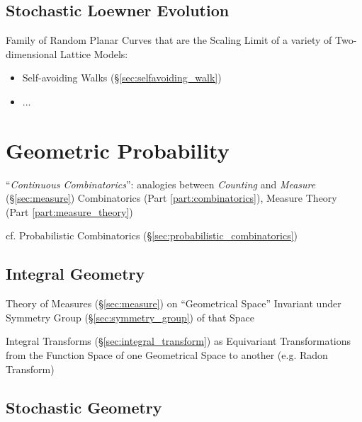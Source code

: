 \subsection{Stochastic Loewner Evolution}\label{sec:stochastic_loewner}

Family of Random Planar Curves that are the Scaling Limit of a variety of
Two-dimensional Lattice Models:
\begin{itemize}
  \item Self-avoiding Walks (\S\ref{sec:selfavoiding_walk})
  \item ...
\end{itemize}



\section{Geometric Probability}\label{sec:geometric_probability}

``\emph{Continuous Combinatorics}'': analogies between \emph{Counting} and
\emph{Measure} (\S\ref{sec:measure}) \fist Combinatorics (Part
\ref{part:combinatorics}), Measure Theory (Part \ref{part:measure_theory})

cf. Probabilistic Combinatorics (\S\ref{sec:probabilistic_combinatorics})



\subsection{Integral Geometry}\label{sec:integral_geometry}

Theory of Measures (\S\ref{sec:measure}) on ``Geometrical Space'' Invariant
under Symmetry Group (\S\ref{sec:symmetry_group}) of that Space

Integral Transforms (\S\ref{sec:integral_transform}) as Equivariant
Transformations from the Function Space of one Geometrical Space to another
(e.g. Radon Transform)



\subsection{Stochastic Geometry}\label{sec:stochastic_geometry}



